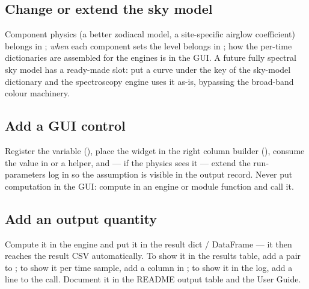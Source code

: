 \subsection{Change or extend the sky model}

Component physics (a better zodiacal model, a site-specific airglow
coefficient) belongs in ; \emph{when} each
component sets the level belongs in ; how the
per-time dictionaries are assembled for the engines is
 in the GUI. A future fully spectral sky
model has a ready-made slot: put a curve under the
 key of the sky-model dictionary and the
spectroscopy engine uses it as-is, bypassing the broad-band colour
machinery.

\subsection{Add a GUI control}

Register the variable (), place the widget in the right
column builder (), consume the value in
 or a helper, and --- if the physics sees it --- extend
the run-parameters log in  so the assumption is
visible in the output record. Never put computation in the GUI: compute
in an engine or module function and call it.

\subsection{Add an output quantity}

Compute it in the engine and put it in the result dict / DataFrame ---
it then reaches the result CSV automatically. To show it in the results
table, add a  pair to
; to show it per time sample, add a
column in ; to show it in the log,
add a line to the  call. Document it in
the README output table and the User Guide.
